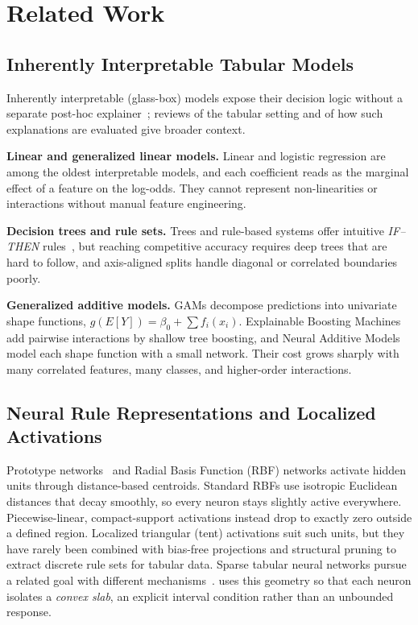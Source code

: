 \section{Related Work}
\label{sec:related_work}

\subsection{Inherently Interpretable Tabular Models}
\label{subsec:related_interpretable}

Inherently interpretable (glass-box) models expose their decision logic without a
separate post-hoc explainer~\cite{rudin2019stop}; reviews of the tabular setting
\cite{obrien2024explainable} and of how such explanations are evaluated
\cite{nauta2023evaluating} give broader context.

\textbf{Linear and generalized linear models.} Linear and logistic regression are
among the oldest interpretable models, and each coefficient reads as the marginal
effect of a feature on the log-odds. They cannot represent non-linearities or
interactions without manual feature engineering.

\textbf{Decision trees and rule sets.} Trees and rule-based systems offer intuitive
\emph{IF--THEN} rules~\cite{wang2017bayesian,friedman2008predictive}, but reaching
competitive accuracy requires deep trees that are hard to follow, and axis-aligned
splits handle diagonal or correlated boundaries poorly.

\textbf{Generalized additive models.} GAMs decompose predictions into univariate
shape functions, $g(E[Y]) = \beta_0 + \sum f_i(x_i)$. Explainable Boosting
Machines~\cite{lou2012intelligible,caruana2015intelligible} add pairwise
interactions by shallow tree boosting, and Neural Additive
Models~\cite{agarwal2021neural} model each shape function with a small network.
Their cost grows sharply with many correlated features, many classes, and
higher-order interactions.

\subsection{Neural Rule Representations and Localized Activations}
\label{subsec:related_neural_rules}

Prototype networks~\cite{chen2019looks} and Radial Basis Function (RBF) networks
activate hidden units through distance-based centroids. Standard RBFs use isotropic
Euclidean distances that decay smoothly, so every neuron stays slightly active
everywhere. Piecewise-linear, compact-support activations instead drop to exactly
zero outside a defined region. Localized triangular (tent) activations suit such
units, but they have rarely been combined with bias-free projections and structural
pruning to extract discrete rule sets for tabular data. Sparse tabular neural
networks pursue a related goal with different mechanisms~\cite{raieli2026escaping}.
\modelname{} uses this geometry so that each neuron isolates a \emph{convex slab},
an explicit interval condition rather than an unbounded response.

